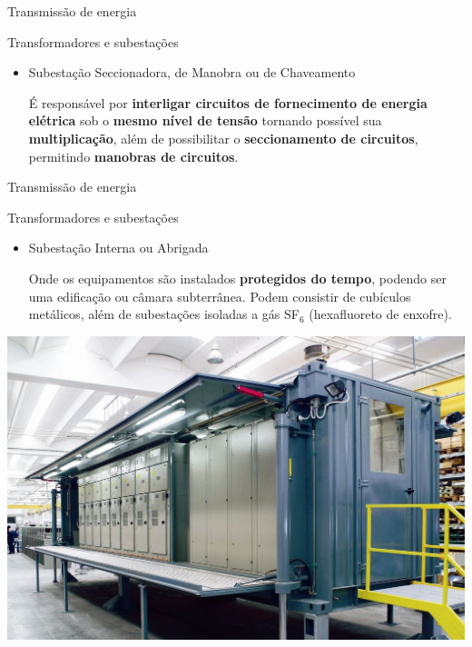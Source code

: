 \begin{frame}{Transmissão de energia}
	\begin{block}{Transformadores e subestações}
		\begin{itemize}
			\item Subestação Seccionadora, de Manobra ou de Chaveamento

			      É responsável por \textbf{interligar circuitos de fornecimento de energia elétrica} sob o \textbf{mesmo nível de tensão} tornando possível sua \textbf{multiplicação}, além de possibilitar o \textbf{seccionamento de circuitos}, permitindo \textbf{manobras de circuitos}.
		\end{itemize}
	\end{block}
\end{frame}


\begin{frame}{Transmissão de energia}
	\begin{block}{Transformadores e subestações}
		\begin{itemize}
			\item Subestação Interna ou Abrigada

			      Onde os equipamentos são instalados \textbf{protegidos do tempo}, podendo ser uma edificação ou câmara subterrânea. Podem consistir de cubículos metálicos, além de subestações isoladas a gás SF$ _6 $ (hexafluoreto de enxofre).
		\end{itemize}
	\end{block}

	\centering
	\includegraphics[width=0.55\linewidth]{Figuras/Ch03/fig17}
\end{frame}


